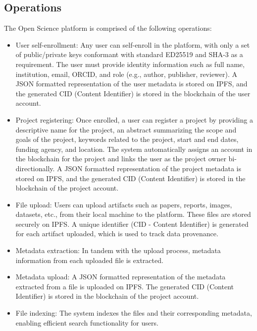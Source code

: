 \documentclass{article}
\begin{document}
\subsection{Operations}

The Open Science platform is comprised of the following operations:

\begin{itemize}
      \item User self-enrollment:
            \indent Any user can self-enroll in the platform, with only a set of public/private keys conformant with standard ED25519 and SHA-3 as a requirement. The user must provide identity information such as full name, institution, email, ORCID, and role (e.g., author, publisher, reviewer). A JSON formatted representation of the user metadata is stored on IPFS, and the generated CID (Content Identifier) is stored in the blockchain of the user account.

      \item Project registering:
            \indent Once enrolled, a user can register a project by providing a descriptive name for the project, an abstract summarizing the scope and goals of the project, keywords related to the project, start and end dates, funding agency, and location. The system automatically assigns an account in the blockchain for the project and links the user as the project owner bi-directionally. A JSON formatted representation of the project metadata is stored on IPFS, and the generated CID (Content Identifier) is stored in the blockchain of the project account.

      \item File upload:
            \indent Users can upload artifacts such as papers, reports, images, datasets, etc., from their local machine to the platform. These files are stored securely on IPFS. A unique identifier (CID - Content Identifier) is generated for each artifact uploaded, which is used to track data provenance.

      \item Metadata extraction:
            \indent In tandem with the upload process, metadata information from each uploaded file is extracted.

      \item Metadata upload:
            \indent A JSON formatted representation of the metadata extracted from a file is uploaded on IPFS. The generated CID (Content Identifier) is stored in the blockchain of the project account.

      \item File indexing:
            \indent The system indexes the files and their corresponding metadata, enabling efficient search functionality for users.


\end{itemize}
\end{document}
